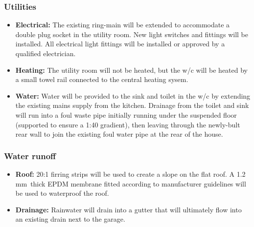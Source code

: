 \documentclass{extension}
\newcommand{\mm}{\,$\mathrm{mm}$}
\begin{document}
\subsubsection{Utilities}
\begin{itemize}
  \item {\bf Electrical:} The existing ring-main will be extended to accommodate a double plug socket in the utility room. New light switches and fittings will be installed. All electrical light fittings will be installed or approved by a qualified electrician.
  \item {\bf Heating:} The utility room will not be heated, but the w/c will be heated by a small towel rail connected to the central heating sysem.
  \item {\bf Water:} Water will be provided to the sink and toilet in the w/c by extending the existing mains supply from the kitchen. Drainage from the toilet and sink will run into a foul waste pipe initially running under the suspended floor (supported to ensure a 1:40 gradient), then leaving through the newly-bult rear wall to join the existing foul water pipe at the rear of the house.
\end{itemize}

\subsubsection{Water runoff}
\begin{itemize}
  \item {\bf Roof:} 20:1 firring strips will be used to create a slope on the flat roof. A 1.2\mm\ thick EPDM membrane\cite{prmem} fitted according to manufacturer guidelines will be used to waterproof the roof.
  \item {\bf Drainage:} Rainwater will drain into a gutter that will ultimately flow into an existing drain next to the garage.
\end{itemize}
\end{document}

